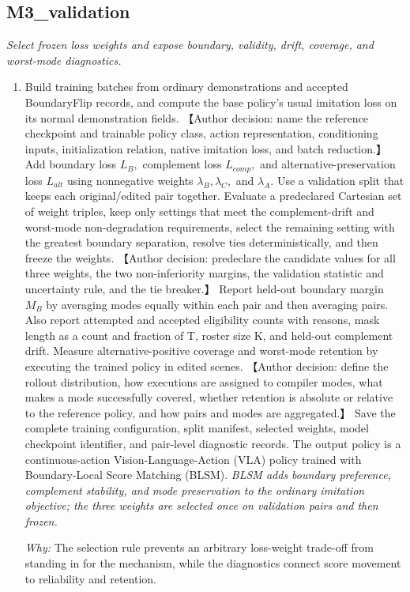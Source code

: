 \documentclass[10pt,a4paper]{article}
\begin{document}
\subsection*{M3\_validation}
\emph{Select frozen loss weights and expose boundary, validity, drift, coverage, and worst-mode diagnostics.}
\begin{enumerate}[leftmargin=*,start=6]
  \item Build training batches from ordinary demonstrations and accepted BoundaryFlip records, and compute the base policy's usual imitation loss on its normal demonstration fields. 【Author decision: name the reference checkpoint and trainable policy class, action representation, conditioning inputs, initialization relation, native imitation loss, and batch reduction.】 Add boundary loss \(L_{B},\) complement loss \(L_{comp},\) and alternative-preservation loss \(L_{alt}\) using nonnegative weights \(\lambda _{B}, \lambda _{C},\) and \(\lambda _{A}.\) Use a validation split that keeps each original/edited pair together. Evaluate a predeclared Cartesian set of weight triples, keep only settings that meet the complement-drift and worst-mode non-degradation requirements, select the remaining setting with the greatest boundary separation, resolve ties deterministically, and then freeze the weights. 【Author decision: predeclare the candidate values for all three weights, the two non-inferiority margins, the validation statistic and uncertainty rule, and the tie breaker.】 Report held-out boundary margin \(M_{B}\) by averaging modes equally within each pair and then averaging pairs. Also report attempted and accepted eligibility counts with reasons, mask length as a count and fraction of T, roster size K, and held-out complement drift. Measure alternative-positive coverage and worst-mode retention by executing the trained policy in edited scenes. 【Author decision: define the rollout distribution, how executions are assigned to compiler modes, what makes a mode successfully covered, whether retention is absolute or relative to the reference policy, and how pairs and modes are aggregated.】 Save the complete training configuration, split manifest, selected weights, model checkpoint identifier, and pair-level diagnostic records. The output policy is a continuous-action Vision-Language-Action (VLA) policy trained with Boundary-Local Score Matching (BLSM).
\noindent\emph{BLSM adds boundary preference, complement stability, and mode preservation to the ordinary imitation objective;\allowbreak{} the three weights are selected once on validation pairs and then frozen.}
\par{}
\par\emph{Why:} The selection rule prevents an arbitrary loss-weight trade-off from standing in for the mechanism, while the diagnostics connect score movement to reliability and retention.
\end{enumerate}
\end{document}
